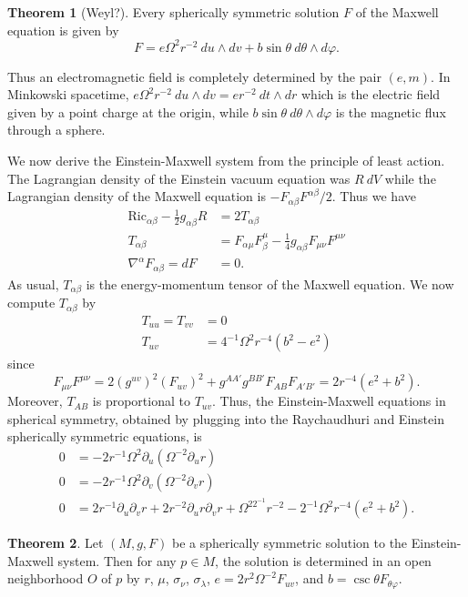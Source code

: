\documentclass[12pt]{report}
\newcommand{\Ric}{\text{Ric}}
\theoremstyle{definition}
\newtheorem{theorem}{Theorem}[chapter]
\theoremstyle{remark}
\begin{document}
\begin{theorem}[Weyl?]
    Every spherically symmetric solution $F$ of the Maxwell equation is given by
    $$F = e\Omega^2r^{-2}~du\wedge dv + b\sin \theta ~d\theta \wedge d\varphi.$$
\end{theorem}
Thus an electromagnetic field is completely determined by the pair $(e, m)$. In Minkowski spacetime, $e\Omega^2r^{-2} ~du\wedge dv = er^{-2} ~dt \wedge dr$ which is the electric field given by a point charge at the origin, while $b\sin \theta ~d\theta \wedge d\varphi$ is the magnetic flux through a sphere.

We now derive the Einstein-Maxwell system from the principle of least action. The Lagrangian density of the Einstein vacuum equation was $R~dV$ while the Lagrangian density of the Maxwell equation is $-F_{\alpha\beta}F^{\alpha\beta}/2$. Thus we have
\begin{align*}
    \Ric_{\alpha\beta} - \frac{1}{2}g_{\alpha\beta}R &= 2T_{\alpha\beta}\\
    T_{\alpha\beta} &= F_{\alpha\mu}F^\mu_\beta - \frac{1}{4}g_{\alpha\beta} F_{\mu\nu} F^{\mu\nu}\\
    \nabla^\alpha F_{\alpha\beta} = dF &= 0.
\end{align*}
As usual, $T_{\alpha\beta}$ is the energy-momentum tensor of the Maxwell equation. We now compute $T_{\alpha\beta}$ by
\begin{align*}
    T_{uu} = T_{vv} &= 0\\
    T_{uv} &= 4^{-1} \Omega^2 r^{-4}(b^2 - e^2)
\end{align*}
since
$$F_{\mu\nu} F^{\mu\nu} = 2(g^{uv})^2 (F_{uv})^2 + g^{AA'}g^{BB'} F_{AB} F_{A'B'} = 2r^{-4}(e^2 + b^2).$$
Moreover, $T_{AB}$ is proportional to $T_{uv}$. Thus, the Einstein-Maxwell equations in spherical symmetry, obtained by plugging into the Raychaudhuri and Einstein spherically symmetric equations, is
\begin{align*}
    0 &= -2r^{-1}\Omega^2 \partial_u (\Omega^{-2} \partial_ur)\\
    0 &= -2r^{-1}\Omega^2 \partial_v (\Omega^{-2} \partial_vr)\\
    0 &= 2r^{-1}\partial_u\partial_v r + 2r^{-2}\partial_ur\partial_vr + \Omega^22^{-1}r^{-2} - 2^{-1}\Omega^2r^{-4}(e^2 + b^2).
\end{align*}
\begin{theorem}
    Let $(M, g, F)$ be a spherically symmetric solution to the Einstein-Maxwell system. Then for any $p \in M$, the solution is determined in an open neighborhood $O$ of $p$ by $r$, $\mu$, $\sigma_\nu$, $\sigma_\lambda$, $e = 2r^2\Omega^{-2}F_{uv}$, and $b = \csc \theta F_{\theta \varphi}$. 
\end{theorem}
\end{document}
